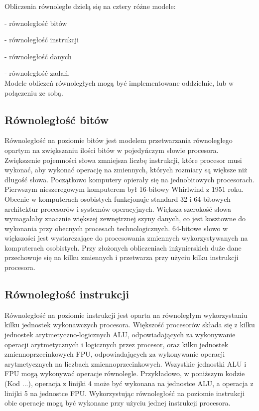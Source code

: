 Obliczenia równoległe dzielą się na cztery różne modele:

- równoległość bitów

- równoległość instrukcji

- równoległość danych

- równoległość zadań.\\

Modele obliczeń równoległych mogą być implementowane oddzielnie, lub w połączeniu ze sobą.

\subsection{Równoległość bitów}\label{sec:bitp}

Równoległość na poziomie bitów jest modelem przetwarzania równoległego opartym na zwiększaniu ilości bitów w pojedyńczym słowie procesora. Zwiększenie pojemności słowa zmniejsza liczbę instrukcji, które procesor musi wykonać, aby wykonać operację na zmiennych, których rozmiary są większe niż długość słowa.
Początkowo komputery opierały się na jednobitowych procesorach. Pierwszym nieszeregowym komputerem był 16-bitowy Whirlwind z 1951 roku. Obecnie w komputerach osobistych funkcjonuje standard 32 i 64-bitowych architektur procesorów i systemów operacyjnych. Większa szerokość słowa wymagałaby znacznie większej zewnętrznej szyny danych, co jest kosztowne do wykonania przy obecnych procesach technologicznych. 64-bitowe słowo w większości jest wystarczające do  procesowania zmiennych wykorzystywanych na komputerach osobistych. Przy złożonych obliczeniach inżynierskich duże dane przechowuje się na kilku zmiennych i przetwarza przy użyciu kilku instrukcji procesora.

\subsection{Równoległość instrukcji}\label{sec:instp}

Równoległość na poziomie instrukcji jest oparta na równoległym wykorzystaniu kilku jednostek wykonawczych procesora. Większość procesorów składa się z kilku jednostek arytmetyczno-logicznych ALU, odpowiadających za wykonywanie operacji arytmetycznych i logicznych przez procesor, oraz kilku jednostek zmiennoprzecinkowych FPU, odpowiadających za wykonywanie operacji arytmetycznych na liczbach zmiennoprzecinkowych. Wszystkie jednostki ALU i FPU mogą wykonywać operacje równolegle. Przykładowo, w poniższym kodzie (Kod ...), operacja z linijki 4 może być wykonana na jednostce ALU, a operacja z linijki 5 na jednostce FPU. Wykorzystując równoległość na poziomie instrukcji obie operacje mogą być wykonane przy użyciu jednej instrukcji procesora.

